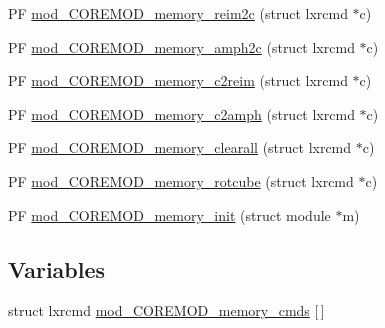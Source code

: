\begin{DoxyCompactItemize}
\item 
P\+F \hyperlink{PIAACMCdesign_2src_2COREMOD__memory_2COREMOD__memory-util_8c_afce60e26804712fdb9dbe59f25fe1eff}{mod\+\_\+\+C\+O\+R\+E\+M\+O\+D\+\_\+memory\+\_\+reim2c} (struct lxrcmd $\ast$c)
\item 
P\+F \hyperlink{PIAACMCdesign_2src_2COREMOD__memory_2COREMOD__memory-util_8c_abceffdcf049bab39e5757955893f11c5}{mod\+\_\+\+C\+O\+R\+E\+M\+O\+D\+\_\+memory\+\_\+amph2c} (struct lxrcmd $\ast$c)
\item 
P\+F \hyperlink{PIAACMCdesign_2src_2COREMOD__memory_2COREMOD__memory-util_8c_ae37ffb77b7ef8d398d7c6b3bd0586495}{mod\+\_\+\+C\+O\+R\+E\+M\+O\+D\+\_\+memory\+\_\+c2reim} (struct lxrcmd $\ast$c)
\item 
P\+F \hyperlink{PIAACMCdesign_2src_2COREMOD__memory_2COREMOD__memory-util_8c_ab9d70c426dda1c8fa072c7969ddb161d}{mod\+\_\+\+C\+O\+R\+E\+M\+O\+D\+\_\+memory\+\_\+c2amph} (struct lxrcmd $\ast$c)
\item 
P\+F \hyperlink{PIAACMCdesign_2src_2COREMOD__memory_2COREMOD__memory-util_8c_a7bcce1b7da3734bf52c1c12b74d2b746}{mod\+\_\+\+C\+O\+R\+E\+M\+O\+D\+\_\+memory\+\_\+clearall} (struct lxrcmd $\ast$c)
\item 
P\+F \hyperlink{PIAACMCdesign_2src_2COREMOD__memory_2COREMOD__memory-util_8c_a6c1e41bcef306b883c1f93eb1334d24c}{mod\+\_\+\+C\+O\+R\+E\+M\+O\+D\+\_\+memory\+\_\+rotcube} (struct lxrcmd $\ast$c)
\item 
P\+F \hyperlink{PIAACMCdesign_2src_2COREMOD__memory_2COREMOD__memory-util_8c_aa5bc0cd7000dafd06d808ebcf832b0e8}{mod\+\_\+\+C\+O\+R\+E\+M\+O\+D\+\_\+memory\+\_\+init} (struct module $\ast$m)
\end{DoxyCompactItemize}
\subsection*{Variables}
\begin{DoxyCompactItemize}
\item 
struct lxrcmd \hyperlink{PIAACMCdesign_2src_2COREMOD__memory_2COREMOD__memory-util_8c_a049011604b9403caffa7a6fa0538ce27}{mod\+\_\+\+C\+O\+R\+E\+M\+O\+D\+\_\+memory\+\_\+cmds} \mbox{[}$\,$\mbox{]}
\end{DoxyCompactItemize}


